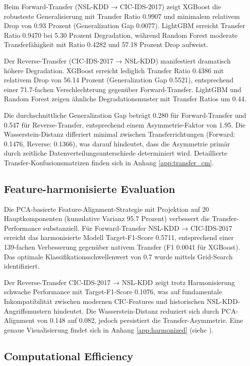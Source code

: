 \documentclass[11pt,a4paper]{article}
\begin{document}
    Beim Forward-Transfer (NSL-KDD → CIC-IDS-2017) zeigt XGBoost die robusteste Generalisierung mit Transfer Ratio 0.9907 und minimalem relativem Drop von 0.93 Prozent (Generalization Gap 0.0077). LightGBM erreicht Transfer Ratio 0.9470 bei 5.30 Prozent Degradation, während Random Forest moderate Transferfähigkeit mit Ratio 0.4282 und 57.18 Prozent Drop aufweist.

    Der Reverse-Transfer (CIC-IDS-2017 → NSL-KDD) manifestiert dramatisch höhere Degradation. XGBoost erreicht lediglich Transfer Ratio 0.4386 mit relativem Drop von 56.14 Prozent (Generalization Gap 0.5521), entsprechend einer 71.7-fachen Verschlechterung gegenüber Forward-Transfer. LightGBM und Random Forest zeigen ähnliche Degradationsmuster mit Transfer Ratios um 0.44.

    Die durchschnittliche Generalization Gap beträgt 0.280 für Forward-Transfer und 0.547 für Reverse-Transfer, entsprechend einem Asymmetrie-Faktor von 1.95. Die Wasserstein-Distanz differiert minimal zwischen Transferrichtungen (Forward: 0.1476, Reverse: 0.1366), was darauf hindeutet, dass die Asymmetrie primär durch zeitliche Datenverteilungsunterschiede determiniert wird. Detaillierte Transfer-Konfusionsmatrizen finden sich in Anhang \ref{app:transfer_cm}.

    \subsection{Feature-harmonisierte Evaluation}

    Die PCA-basierte Feature-Alignment-Strategie mit Projektion auf 20 Hauptkomponenten (kumulative Varianz 95.7 Prozent) verbessert die Transfer-Performance substanziell. Für Forward-Transfer NSL-KDD → CIC-IDS-2017 erreicht das harmonisierte Modell Target-F1-Score 0.5711, entsprechend einer 139-fachen Verbesserung gegenüber nativem Transfer (F1 0.0041 für XGBoost). Das optimale Klassifikationsschwellenwert von 0.7 wurde mittels Grid-Search identifiziert.

    Der Reverse-Transfer CIC-IDS-2017 → NSL-KDD zeigt trotz Harmonisierung schwache Performance mit Target-F1-Score 0.1076, was auf fundamentale Inkompatibilität zwischen modernen CIC-Features und historischen NSL-KDD-Angriffsmustern hindeutet. Die Wasserstein-Distanz reduziert sich durch PCA-Alignment von 0.148 auf 0.082, jedoch persistiert die Transfer-Asymmetrie. Eine genaue Visualisierung findet sich in Anhang \ref{app:harmonized} (siehe \parencite{Weirauch2025}).

    \subsection{Computational Efficiency}
\end{document}
